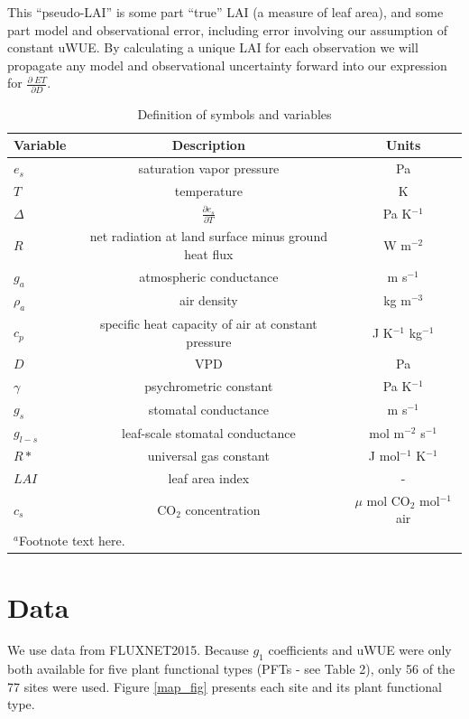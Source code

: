 \documentclass[draft,linenumbers]{agujournal}
\begin{document}
This ``pseudo-LAI'' is some part ``true'' LAI (a measure of leaf area), and some part model and observational error, including error involving our assumption of constant uWUE. By calculating a unique LAI for each observation we will propagate any model and observational uncertainty forward into our expression for $\frac{\partial \; ET}{\partial D}$. 


\begin{table}
\caption{Definition of symbols and variables}
\centering
\begin{tabular}{l c c}
\hline
 Variable & Description & Units  \\
\hline
$e_s$  & saturation vapor pressure & Pa  \\ 
$T$  & temperature  & K \\
$\Delta$  & $\frac{\partial e_s}{\partial T}$ & Pa K$^{-1}$ \\
$R$  & net radiation at land surface minus ground heat flux & W m$^{-2}$   \\
  $g_a$  & atmospheric conductance & m s$^{-1}$  \\
  $\rho_a$  & air density & kg m$^{-3}$  \\
  $c_p$  & specific heat capacity of air at constant pressure & J K$^{-1}$ kg$^{-1}$ \\
  $D$  & VPD & Pa  \\
  $\gamma$  & psychrometric constant & Pa K$^{-1}$   \\
  $g_s$  & stomatal conductance & m s$^{-1}$  \\
  $g_{l-s}$  & leaf-scale stomatal conductance & mol m$^{-2}$ s$^{-1}$  \\
  $R*$ & universal gas constant & J mol$^{-1}$ K$^{-1}$ \\
  $LAI$ & leaf area index & -\\
  $c_s$ & CO$_2$ concentration & $\mu$ mol CO$_2$ mol$^{-1}$ air\\
\hline
\multicolumn{2}{l}{$^{a}$Footnote text here.}
\end{tabular}
\end{table}


\section{Data}

We use data from FLUXNET2015. Because $g_1$ coefficients \citep{Lin_2015} and uWUE were only both available for five plant functional types (PFTs - see Table 2),  only 56 of the 77 sites were used. Figure \ref{map_fig}  presents each site and its plant functional type.
\end{document}
